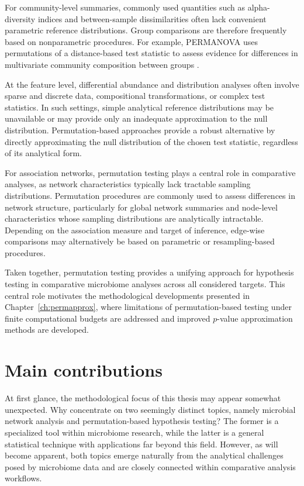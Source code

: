 For community-level summaries, commonly used quantities such as alpha-diversity indices and between-sample dissimilarities often lack convenient parametric reference distributions. Group comparisons are therefore frequently based on nonparametric procedures. For example, PERMANOVA uses permutations of a distance-based test statistic to assess evidence for differences in multivariate community composition between groups \citep{anderson2001new}.

At the feature level, differential abundance and distribution analyses often involve sparse and discrete data, compositional transformations, or complex test statistics. In such settings, simple analytical reference distributions may be unavailable or may provide only an inadequate approximation to the null distribution.
Permutation-based approaches provide a robust alternative by directly approximating the null distribution of the chosen test statistic, regardless of its analytical form.

For association networks, permutation testing plays a central role in comparative analyses, as network characteristics typically lack tractable sampling distributions.
Permutation procedures are commonly used to assess differences in network structure, particularly for global network summaries and node-level characteristics whose sampling distributions are analytically intractable. Depending on the association measure and target of inference, edge-wise comparisons may alternatively be based on parametric or resampling-based procedures.

Taken together, permutation testing provides a unifying approach for hypothesis testing in comparative microbiome analyses across all considered targets. 
This central role motivates the methodological developments presented in Chapter~\ref{ch:permapprox}, where limitations of permutation-based testing under finite computational budgets are addressed and improved $p$-value approximation methods are developed.

\section{Main contributions}
\label{sec:intro:contributions}

At first glance, the methodological focus of this thesis may appear somewhat unexpected. 
Why concentrate on two seemingly distinct topics, namely microbial network analysis and permutation-based hypothesis testing? 
The former is a specialized tool within microbiome research, while the latter is a general statistical technique with applications far beyond this field. 
However, as will become apparent, both topics emerge naturally from the analytical challenges posed by microbiome data and are closely connected within comparative analysis workflows.

